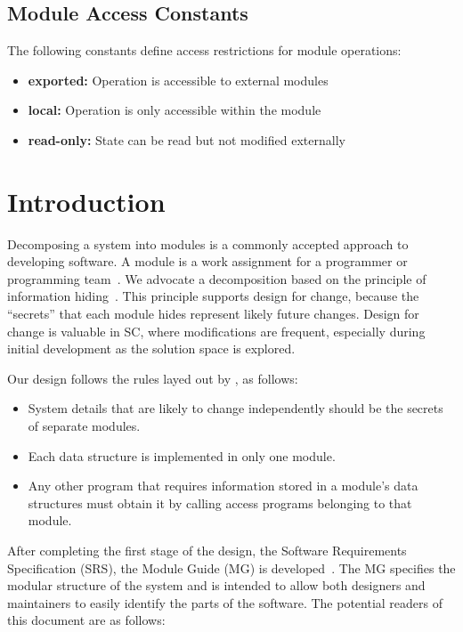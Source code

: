 \documentclass[12pt, titlepage]{article}
\begin{document}
\subsection{Module Access Constants}

The following constants define access restrictions for module operations:
\begin{itemize}
\item \textbf{exported:} Operation is accessible to external modules
\item \textbf{local:} Operation is only accessible within the module
\item \textbf{read-only:} State can be read but not modified externally
\end{itemize}

\newpage


\section{Introduction}

Decomposing a system into modules is a commonly accepted approach to developing
software.  A module is a work assignment for a programmer or programming
team~\cite{Parnas1984}.  We advocate a decomposition
based on the principle of information hiding~\cite{Parnas1972}.  This
principle supports design for change, because the ``secrets'' that each module
hides represent likely future changes.  Design for change is valuable in SC,
where modifications are frequent, especially during initial development as the
solution space is explored.  

Our design follows the rules layed out by \cite{Parnas1984}, as follows:
\begin{itemize}
\item System details that are likely to change independently should be the
  secrets of separate modules.
\item Each data structure is implemented in only one module.
\item Any other program that requires information stored in a module's data
  structures must obtain it by calling access programs belonging to that module.
\end{itemize}

After completing the first stage of the design, the Software Requirements
Specification (SRS), the Module Guide (MG) is developed~\cite{Parnas1984}. The MG
specifies the modular structure of the system and is intended to allow both
designers and maintainers to easily identify the parts of the software.  The
potential readers of this document are as follows:
\end{document}
